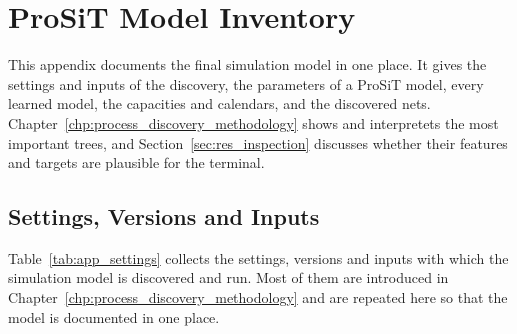 \chapter{ProSiT Model Inventory}
\label{app:prosit_inventory}

This appendix documents the final simulation model in one place. It gives the
settings and inputs of the discovery, the parameters of a ProSiT model, every
learned model, the capacities and calendars, and the discovered nets.
Chapter~\ref{chp:process_discovery_methodology} shows and interpretets the most
important trees, and Section~\ref{sec:res_inspection} discusses whether their
features and targets are plausible for the terminal.

\section{Settings, Versions and Inputs}
\label{app:prosit_settings}

Table~\ref{tab:app_settings} collects the settings, versions and inputs with which
the simulation model is discovered and run. Most of them are introduced in
Chapter~\ref{chp:process_discovery_methodology} and are repeated here so that the
model is documented in one place.

